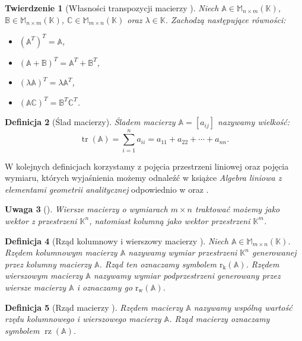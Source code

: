 \documentclass[12pt,a4paper]{report}
\newtheorem{df}{Definicja}[chapter]
\newtheorem{tw}[df]{Twierdzenie}
\newtheorem{uwaga}[df]{Uwaga}
\newcommand{\setK}{\mathbb{K}}
\newcommand{\rw}[1]{\operatorname{r_w}\left({#1} \right)}
\newcommand{\rk}[1]{\operatorname{r_k}\left({#1} \right)}
\newcommand{\rz}[1]{\operatorname{rz}\left({#1} \right)}
\newcommand{\tr}[1]{\operatorname{tr}\left({#1} \right)}
\begin{document}
\begin{tw}[Własności transpozycji macierzy {\citep[Sec 5.1 Tw. 5.1]{ealIII}}]
Niech $\mathbb{A} \in \mathbb{M}_{n \times m} (\setK)$, $\mathbb{B} \in \mathbb{M}_{n \times m} (\setK)$, $\mathbb{C} \in \mathbb{M}_{m \times n} (\setK)$ oraz $\lambda \in \setK$.
Zachodzą następujące równości:
\begin{itemize}
\item $(\mathbb{A}^T)^T = \mathbb{A}$,
\item $(\mathbb{A} + \mathbb{B})^T = \mathbb{A}^T + \mathbb{B}^T$,
\item $(\lambda \mathbb{A})^T = \lambda \mathbb{A}^T$,
\item $(\mathbb{A}\mathbb{C})^T = \mathbb{B}^T \mathbb{C}^T$.
\end{itemize}
\end{tw}

\begin{df}[Ślad macierzy]
Śladem macierzy  $\mathbb{A} = [a_{ij}]$ nazywamy wielkość:
$$
\tr{\mathbb{A}} = \sum_{i=1}^n a_{ii} = a_{11} + a_{22} + \cdots + a_{nn}.
$$
\end{df}

W kolejnych definicjach korzystamy z pojęcia przestrzeni liniowej oraz pojęcia wymiaru, których wyjaśnienia możemy odnaleźć w książce \textit{Algebra liniowa z elementami geometrii analitycznej} odpowiednio w {\citep[Sec 7.1]{alzega}} oraz {\citep[Sec 7.5]{alzega}}.

\begin{uwaga}[{\citep[Sec 8.1]{alzega}}]
Wiersze macierzy o wymiarach $m \times n$ traktować możemy jako wektor z przestrzeni $\setK^n$, natomiast kolumną jako wektor przestrzeni $\setK^m$.
\end{uwaga}

\begin{df}[Rząd kolumnowy i wierszowy macierzy {\citep[Sec 8.1]{alzega}}]
Niech $\mathbb{A} \in \mathbb{M}_{m\times n}(\setK)$. Rzędem kolumnowym macierzy $\mathbb{A}$ nazywamy wymiar przestrzeni $\setK^n$ generowanej przez kolumny macierzy $\mathbb{A}$. Rząd ten oznaczamy symbolem $\rk{\mathbb{A}}$. Rzędem wierszowym macierzy $\mathbb{A}$ nazywamy wymiar podprzestrzeni generowany przez wiersze macierzy $\mathbb{A}$ i oznaczamy go $\rw{\mathbb{A}}$.
\end{df}

\begin{df}[Rząd macierzy {\citep[Sec 8.1]{alzega}}]
Rzędem macierzy $\mathbb{A}$ nazywamy wspólną wartość rzędu kolumnowego i wierszowego macierzy $\mathbb{A}$. Rząd macierzy oznaczamy symbolem $\rz{\mathbb{A}}$.
\end{df}
\end{document}

